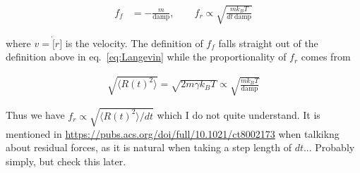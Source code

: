 \begin{align*}
  f_f &= -\frac{m}{\text{damp}}, \qquad 
  f_r \propto \sqrt{\frac{m k_B T}{dt \ \text{damp}}}
\end{align*}

where $v = \dot[r]$ is the velocity. The definition of $f_f$ falls straight out of the definition above in eq.~\eqref{eq:Langevin} while the proportionality of $f_r$ comes from

\begin{align*}
  \sqrt{\langle R(t)^2 \rangle} = \sqrt{2m\gamma k_B T} \propto \sqrt{\frac{m k_B T}{\text{damp}}} 
\end{align*}

Thus we have $f_r \propto \sqrt{\langle R(t)^2 \rangle / dt}$ which I do not quite understand. It is mentioned in \url{https://pubs.acs.org/doi/full/10.1021/ct8002173} when talkikng about residual forces, as it is natural when taking a step length of $dt$... Probably simply, but check this later. 
















